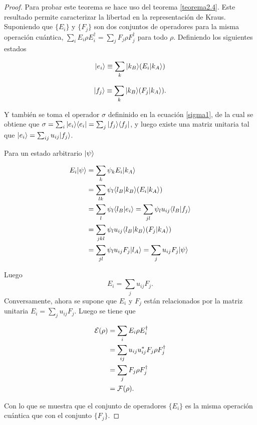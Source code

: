 \begin{proof}
Para probar este teorema se hace uso del teorema {\ref{teorema2.4}}. Este resultado permite caracterizar la libertad en la representación de Kraus. Suponiendo que $\{E_i\}$ y $\{F_j\}$ son dos conjuntos de operadores para la misma operación cuántica, $\sum_i E_i \rho E_i^\dagger= \sum_j F_j \rho F_j^\dagger$ para todo $\rho$. Definiendo los siguientes estados

\begin{equation}
    |e_i\rangle\equiv \sum_k |k_B\rangle(E_i|k_A\rangle)
\end{equation}



\begin{equation}
    |f_j\rangle\equiv \sum_k |k_B\rangle(F_j|k_A\rangle).
\end{equation}


Y también se toma el operador $\sigma$ defininido en la ecuación {\ref{sigma1}}, de la cual se obtiene que $\sigma=\sum_i|e_i \rangle \langle e_i|=\sum_j |f_j\rangle \langle f_j|$, y luego existe una matriz unitaria tal que $  |e_i\rangle=\sum_{ij}u_{ij}|f_j\rangle$.

Para un estado arbitrario $|\psi\rangle$

\begin{equation}
    \begin{split}
        E_i|\psi\rangle&=\sum_k \psi_k E_i|k_A\rangle\\
                   &= \sum_{lk}\psi_l\langle l_B |k_B\rangle(E_i|k_A\rangle)\\
                   &=\sum_{l}\psi_l\langle l_B| e_i\rangle=\sum_{jl}\psi_l u_{ij}\langle l_B|f_j\rangle\\
                   &=\sum_{jkl}\psi_l u_{ij}\langle l_B|k_B\rangle(F_j|k_A\rangle)\\
                   &=\sum_{jl}\psi_l u_{ij}F_j|l_A\rangle=\sum_j u_{ij} F_j |\psi\rangle\\
    \end{split}
\end{equation}


Luego \[E_i=\sum_j u_{ij}F_j.\] Conversamente, ahora se supone que $E_i$ y $F_j$ están relacionados por la matriz unitaria $E_i=\sum_j u_{ij}F_j$. Luego se tiene que



\begin{equation}
    \begin{split}
        \mathcal{E}(\rho)&=\sum_i  E_i\rho E_i^\dagger\\
            &=\sum_{ij} u_{ij}u_{ij}^*F_j\rho F_j^\dagger\\
            &=\sum_j F_j\rho F_j^\dagger\\
            &=\mathcal{F}(\rho).
    \end{split}
\end{equation}

Con lo que se muestra que el conjunto de operadores $\{E_i\}$ es la misma operación cuántica que con el conjunto $\{F_j\}$.








\end{proof}

